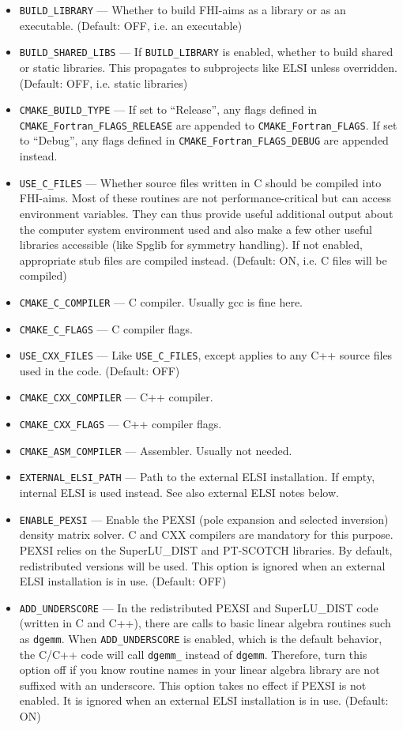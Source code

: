 \begin{itemize}
\item \texttt{BUILD\_LIBRARY} --- Whether to build FHI-aims as a library or as an executable. (Default: OFF, i.e. an executable)
\item \texttt{BUILD\_SHARED\_LIBS} --- If \texttt{BUILD\_LIBRARY} is enabled, whether to build shared or static libraries. This propagates to subprojects like ELSI unless overridden. (Default: OFF, i.e. static libraries)
\item \texttt{CMAKE\_BUILD\_TYPE} --- If set to ``Release'', any flags defined in \\
  \texttt{CMAKE\_Fortran\_FLAGS\_RELEASE} are appended to \texttt{CMAKE\_Fortran\_FLAGS}. If set to ``Debug'', any flags defined in \texttt{CMAKE\_Fortran\_FLAGS\_DEBUG} are appended instead.
\item \texttt{USE\_C\_FILES} ---  Whether source files written in C should be compiled into FHI-aims. Most of these routines are not performance-critical but can access environment variables. They can thus provide useful additional output about the computer system environment used and also make a few other useful libraries accessible (like Spglib for symmetry handling). If not enabled, appropriate stub files are compiled instead. (Default: ON, i.e. C files will be compiled)
\item \texttt{CMAKE\_C\_COMPILER} --- C compiler. Usually gcc is fine here.
\item \texttt{CMAKE\_C\_FLAGS} --- C compiler flags.
\item \texttt{USE\_CXX\_FILES} --- Like \texttt{USE\_C\_FILES}, except applies to any C++ source files used in the code. (Default: OFF)
\item \texttt{CMAKE\_CXX\_COMPILER} --- C++ compiler.
\item \texttt{CMAKE\_CXX\_FLAGS} --- C++ compiler flags.
\item \texttt{CMAKE\_ASM\_COMPILER} --- Assembler. Usually not needed.
\item \texttt{EXTERNAL\_ELSI\_PATH} --- Path to the external ELSI installation. If empty, internal ELSI is used instead. See also external ELSI notes below.
\item \texttt{ENABLE\_PEXSI} --- Enable the PEXSI (pole expansion and selected inversion) density matrix solver. C and CXX compilers are mandatory for this purpose. PEXSI relies on the SuperLU\_DIST and PT-SCOTCH libraries. By default, redistributed versions will be used. This option is ignored when an external ELSI installation is in use. (Default: OFF)
\item \texttt{ADD\_UNDERSCORE} --- In the redistributed PEXSI and SuperLU\_DIST code (written in C and C++), there are calls to basic linear algebra routines such as \texttt{dgemm}. When \texttt{ADD\_UNDERSCORE} is enabled, which is the default behavior, the C/C++ code will call \texttt{dgemm\_} instead of \texttt{dgemm}. Therefore, turn this option off if you know routine names in your linear algebra library are not suffixed with an underscore. This option takes no effect if PEXSI is not enabled. It is ignored when an external ELSI installation is in use. (Default: ON)

\end{itemize}
